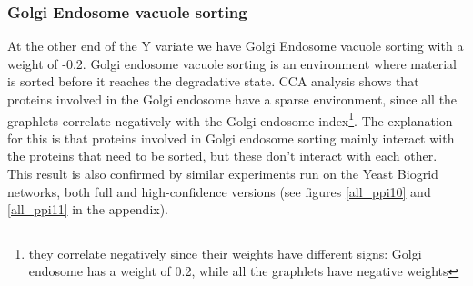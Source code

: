 \subsubsection{Golgi Endosome vacuole sorting}
At the other end of the Y variate we have Golgi Endosome vacuole sorting with a weight of -0.2. Golgi endosome vacuole sorting is an environment where material is sorted before it reaches the degradative state. CCA analysis shows that proteins involved in the Golgi endosome have a sparse environment, since all the graphlets correlate negatively with the Golgi endosome index\footnote{they correlate negatively since their weights have different signs: Golgi endosome has a weight of 0.2, while all the graphlets have negative weights}. The explanation for this is that proteins involved in Golgi endosome sorting mainly interact with the proteins that need to be sorted, but these don't interact with each other. This result is also confirmed by similar experiments run on the Yeast Biogrid networks, both full and high-confidence versions (see figures \ref{all_ppi10} and \ref{all_ppi11} in the appendix).

